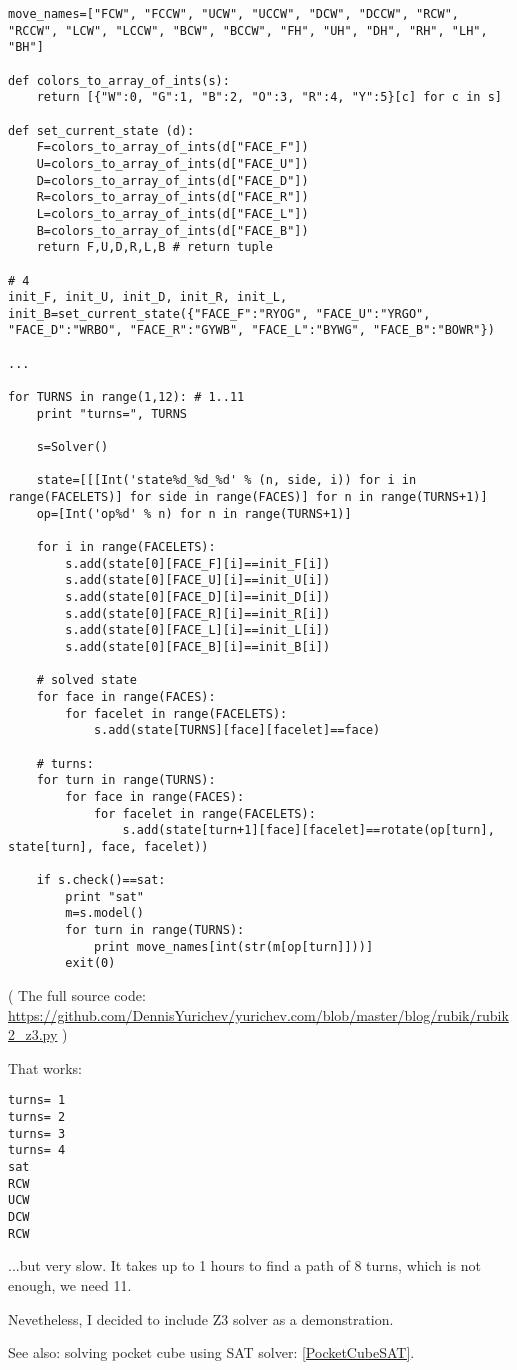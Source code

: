 \begin{lstlisting}
move_names=["FCW", "FCCW", "UCW", "UCCW", "DCW", "DCCW", "RCW", "RCCW", "LCW", "LCCW", "BCW", "BCCW", "FH", "UH", "DH", "RH", "LH", "BH"]

def colors_to_array_of_ints(s):
    return [{"W":0, "G":1, "B":2, "O":3, "R":4, "Y":5}[c] for c in s]

def set_current_state (d):
    F=colors_to_array_of_ints(d["FACE_F"])
    U=colors_to_array_of_ints(d["FACE_U"])
    D=colors_to_array_of_ints(d["FACE_D"])
    R=colors_to_array_of_ints(d["FACE_R"])
    L=colors_to_array_of_ints(d["FACE_L"])
    B=colors_to_array_of_ints(d["FACE_B"])
    return F,U,D,R,L,B # return tuple

# 4
init_F, init_U, init_D, init_R, init_L, init_B=set_current_state({"FACE_F":"RYOG", "FACE_U":"YRGO", "FACE_D":"WRBO", "FACE_R":"GYWB", "FACE_L":"BYWG", "FACE_B":"BOWR"})

...

for TURNS in range(1,12): # 1..11
    print "turns=", TURNS

    s=Solver()

    state=[[[Int('state%d_%d_%d' % (n, side, i)) for i in range(FACELETS)] for side in range(FACES)] for n in range(TURNS+1)]
    op=[Int('op%d' % n) for n in range(TURNS+1)]

    for i in range(FACELETS):
        s.add(state[0][FACE_F][i]==init_F[i])
        s.add(state[0][FACE_U][i]==init_U[i])
        s.add(state[0][FACE_D][i]==init_D[i])
        s.add(state[0][FACE_R][i]==init_R[i])
        s.add(state[0][FACE_L][i]==init_L[i])
        s.add(state[0][FACE_B][i]==init_B[i])

    # solved state
    for face in range(FACES):
        for facelet in range(FACELETS):
            s.add(state[TURNS][face][facelet]==face)

    # turns:
    for turn in range(TURNS):
        for face in range(FACES):
            for facelet in range(FACELETS):
                s.add(state[turn+1][face][facelet]==rotate(op[turn], state[turn], face, facelet))

    if s.check()==sat:
        print "sat"
        m=s.model()
        for turn in range(TURNS):
            print move_names[int(str(m[op[turn]]))]
        exit(0)
\end{lstlisting}

( The full source code: \url{https://github.com/DennisYurichev/yurichev.com/blob/master/blog/rubik/rubik2_z3.py} )

That works:

\begin{lstlisting}
turns= 1
turns= 2
turns= 3
turns= 4
sat
RCW
UCW
DCW
RCW
\end{lstlisting}

...but very slow. It takes up to 1 hours to find a path of 8 turns, which is not enough, we need 11.

Nevetheless, I decided to include Z3 solver as a demonstration.

See also: solving pocket cube using SAT solver: \ref{PocketCubeSAT}.

